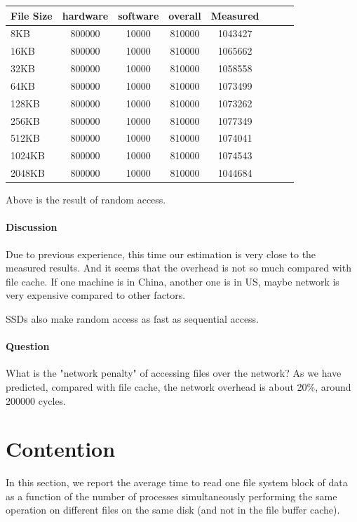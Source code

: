 \begin{center}
\begin{tabular}{l*{6}{c}r}
File Size             &  hardware & software & overall & Measured \\
\hline
8KB & 800000 & 10000 & 810000 & 1043427\\ 
16KB & 800000 & 10000 & 810000 & 1065662\\ 
32KB & 800000 & 10000 & 810000 & 1058558\\
64KB & 800000 & 10000 & 810000 & 1073499\\
128KB & 800000 & 10000 & 810000 & 1073262\\
256KB & 800000 & 10000 & 810000 & 1077349\\
512KB & 800000 & 10000 & 810000 & 1074041\\
1024KB & 800000 & 10000 & 810000 & 1074543\\
2048KB & 800000 & 10000 & 810000 & 1044684\\

\end{tabular}
\end{center}

Above is the result of random access.

\paragraph{Discussion}
Due to previous experience, this time our estimation is very close to the measured results. And it seems that the overhead is not so much compared with file cache. If one machine is in China, another one is in US, maybe network is very expensive compared to other factors.

SSDs also make random access as fast as sequential access.

\paragraph{Question} What is the "network penalty" of accessing files over the network?  As we have predicted, compared with file cache, the network overhead is about 20\%, around 200000 cycles.

\section{Contention}
In this section, we report the average time to read one file system block of data as a function of the number of processes simultaneously performing the same operation on different files on the same disk (and not in the file buffer cache).


